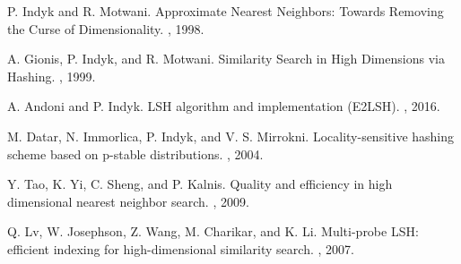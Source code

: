 \documentclass[11pt]{article}
\begin{document}

\begin{thebibliography}{10}
\itemsep=1pt
\begin{small}




P. Indyk and R. Motwani.
\newblock Approximate Nearest Neighbors: Towards Removing the Curse of Dimensionality.
, 1998.

A. Gionis, P. Indyk, and R. Motwani.
\newblock Similarity Search in High Dimensions via Hashing.
, 1999.

A. Andoni and P. Indyk.
\newblock LSH algorithm and implementation (E2LSH).
, 2016.


M. Datar, N. Immorlica, P. Indyk, and V. S. Mirrokni.
\newblock Locality-sensitive hashing scheme based on p-stable distributions.
, 2004.

Y. Tao, K. Yi, C. Sheng, and P. Kalnis.
\newblock Quality and efficiency in high dimensional nearest neighbor search.
, 2009.

Q. Lv, W. Josephson, Z. Wang, M. Charikar, and K. Li.
\newblock Multi-probe LSH: efficient indexing for high-dimensional similarity search.
, 2007.


\end{small}
\end{thebibliography}
\end{document}
